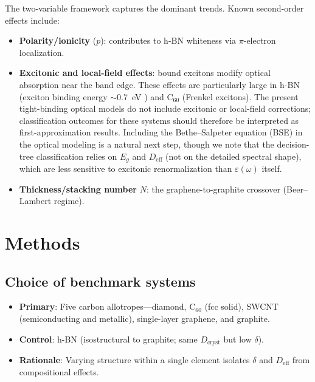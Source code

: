 \documentclass[twocolumn,showpacs,preprintnumbers,amsmath,amssymb,prb]{revtex4-2}
\begin{document}
The two-variable framework captures the dominant trends. Known
second-order effects include:
\begin{itemize}
  \item \textbf{Polarity/ionicity} ($p$): contributes to h-BN whiteness
    via $\pi$-electron localization.
  \item \textbf{Excitonic and local-field effects}: bound excitons
    modify optical absorption near the band edge. These effects are
    particularly large in h-BN (exciton binding energy $\sim$0.7~eV
    \cite{Arnaud2006}) and C$_{60}$ (Frenkel excitons). The present
    tight-binding optical models do not include excitonic or local-field
    corrections; classification outcomes for these systems should
    therefore be interpreted as first-approximation results.
    Including the Bethe--Salpeter equation (BSE) in the optical
    modeling is a natural next step, though we note that the
    decision-tree classification relies on $E_g$ and $D_\mathrm{eff}$
    (not on the detailed spectral shape), which are less sensitive to
    excitonic renormalization than $\varepsilon(\omega)$ itself.
  \item \textbf{Thickness/stacking number} $N$: the graphene-to-graphite
    crossover (Beer--Lambert regime).
\end{itemize}

\section{Methods}
\label{sec:methods}

\subsection{Choice of benchmark systems}

\begin{itemize}
  \item \textbf{Primary}: Five carbon allotropes---diamond,
    C$_{60}$ (fcc solid), SWCNT (semiconducting and metallic),
    single-layer graphene, and graphite.
  \item \textbf{Control}: h-BN (isostructural to graphite; same
    $D_\mathrm{cryst}$ but low $\delta$).
  \item \textbf{Rationale}: Varying structure within a single element
    isolates $\delta$ and $D_\mathrm{eff}$ from compositional effects.
\end{itemize}
\end{document}
